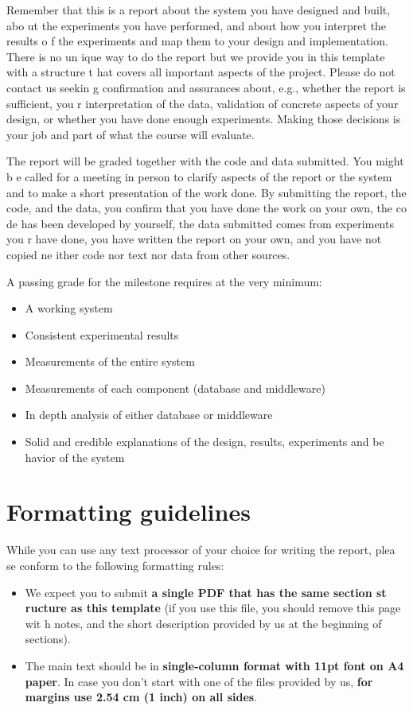 \documentclass[11pt]{article}
\begin{document}
Remember that this is a report about the system you have designed and built, abo
ut the experiments you have performed, and about how you interpret the results o
f the experiments and map them to your design and implementation. There is no un
ique way to do the report but we provide you in this template with a structure t
hat covers all important aspects of the project. Please do not contact us seekin
g confirmation and assurances about, e.g., whether the report is sufficient, you
r interpretation of the data, validation of concrete aspects of your design, or
whether you have done enough experiments. Making those decisions is your job and
 part of what the course will evaluate.

The report will be graded together with the code and data submitted. You might b
e called for a meeting in person to clarify aspects of the report or the system
and to make a short presentation of the work done. By submitting the report, the
 code, and the data, you confirm that you have done the work on your own, the co
de has been developed by yourself, the data submitted comes from experiments you
r have done, you have written the report on your own, and you have not copied ne
ither code nor text nor data from other sources.

A passing grade for the milestone requires at the very minimum:
\begin{itemize}
\item A working system
\item Consistent experimental results
\item Measurements of the entire system
\item Measurements of each component (database and middleware)
\item In depth analysis of either database or middleware
\item Solid and credible explanations of the design, results, experiments and be
havior of the system
\end{itemize}

\section*{Formatting guidelines}
While you can use any text processor of your choice for writing the report, plea
se conform to the following formatting rules:
\begin{itemize}
\item  We expect you to submit \textbf{a single PDF that has the same section st
ructure as this template} (if you use this file, you should remove this page wit
h notes, and the short description provided by us at the beginning of sections).
\item  The main text should be in \textbf{single-column format with 11pt font on A4 paper}. In case you don't start with one of the files provided by us,
\textbf{for margins use 2.54 cm (1 inch) on all sides}.
\end{itemize}
\end{document}
